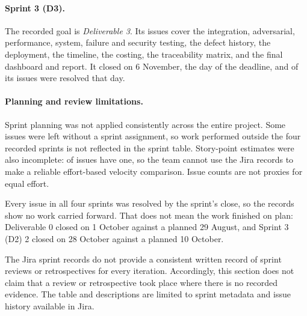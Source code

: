 \paragraph{Sprint 3 (D3).}
The recorded goal is \emph{Deliverable 3}. Its issues cover the integration,
adversarial, performance, system, failure and security testing, the defect
history, the deployment, the timeline, the costing, the traceability matrix,
and the final dashboard and report. It closed on 6 November, the day of the
deadline, and \JiraResolvedDeadline{} of its issues were resolved that day.

\paragraph{Planning and review limitations.}
Sprint planning was not applied consistently across the entire project.
Some issues were left without a sprint assignment, so work performed outside
the four recorded sprints is not reflected in the sprint table. Story-point
estimates were also incomplete: \JiraWithEstimate{} of \JiraIssues{} issues
have one, so the team cannot use the Jira records to make a reliable
effort-based velocity comparison. Issue counts are not proxies for equal
effort.

Every issue in all four sprints was resolved by the sprint's close, so the
records show no work carried forward. That does not mean the work finished
on plan: Deliverable 0 closed on 1 October against a planned 29 August, and
Sprint 3 (D2) 2 closed on 28 October against a planned 10 October.

The Jira sprint records do not provide a consistent written record of sprint
reviews or retrospectives for every iteration. Accordingly, this section
does not claim that a review or retrospective took place where there is no
recorded evidence. The table and descriptions are limited to sprint metadata
and issue history available in Jira.
